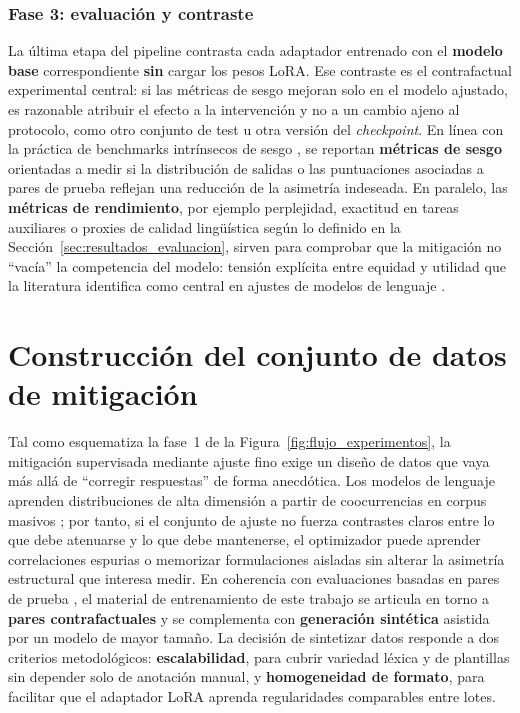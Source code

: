 \documentclass[12pt,a4paper]{report}
\begin{document}
\subsubsection*{Fase 3: evaluación y contraste}

La última etapa del pipeline contrasta cada adaptador entrenado con el \textbf{modelo base} correspondiente \textbf{sin} cargar los pesos LoRA. Ese contraste es el contrafactual experimental central: si las métricas de sesgo mejoran solo en el modelo ajustado, es razonable atribuir el efecto a la intervención y no a un cambio ajeno al protocolo, como otro conjunto de test u otra versión del \textit{checkpoint}. En línea con la práctica de benchmarks intrínsecos de sesgo \cite{nangia_crows-pairs_2020,nadeem_stereoset_2021}, se reportan \textbf{métricas de sesgo} orientadas a medir si la distribución de salidas o las puntuaciones asociadas a pares de prueba reflejan una reducción de la asimetría indeseada. En paralelo, las \textbf{métricas de rendimiento}, por ejemplo perplejidad, exactitud en tareas auxiliares o proxies de calidad lingüística según lo definido en la Sección~\ref{sec:resultados_evaluacion}, sirven para comprobar que la mitigación no ``vacía'' la competencia del modelo: tensión explícita entre equidad y utilidad que la literatura identifica como central en ajustes de modelos de lenguaje \cite{guo_bias_2024}.

\section{Construcción del conjunto de datos de mitigación}
\label{sec:dataset_mitigacion}

Tal como esquematiza la fase~1 de la Figura~\ref{fig:flujo_experimentos}, la mitigación supervisada mediante ajuste fino exige un diseño de datos que vaya más allá de ``corregir respuestas'' de forma anecdótica. Los modelos de lenguaje aprenden distribuciones de alta dimensión a partir de coocurrencias en corpus masivos \cite{caliskan_semantics_2017}; por tanto, si el conjunto de ajuste no fuerza contrastes claros entre lo que debe atenuarse y lo que debe mantenerse, el optimizador puede aprender correlaciones espurias o memorizar formulaciones aisladas sin alterar la asimetría estructural que interesa medir. En coherencia con evaluaciones basadas en pares de prueba \cite{nangia_crows-pairs_2020}, el material de entrenamiento de este trabajo se articula en torno a \textbf{pares contrafactuales} y se complementa con \textbf{generación sintética} asistida por un modelo de mayor tamaño. La decisión de sintetizar datos responde a dos criterios metodológicos: \textbf{escalabilidad}, para cubrir variedad léxica y de plantillas sin depender solo de anotación manual, y \textbf{homogeneidad de formato}, para facilitar que el adaptador LoRA aprenda regularidades comparables entre lotes.
\end{document}

